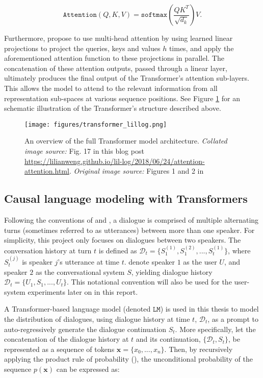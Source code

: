 \begin{equation}
    \texttt{Attention}(Q, K, V) = \texttt{softmax} \left( \frac{QK^T}{\sqrt{d_k}}\right) V.
\end{equation}

Furthermore, \cite{vaswani2017attention} propose to use multi-head attention by using learned linear projections to project the queries, keys and values $h$ times, and apply the aforementioned attention function to these projections in parallel. The concatenation of these attention outputs, passed through a linear layer, ultimately produces the final output of the Transformer's attention sub-layers. This allows the model to attend to the relevant information from all representation sub-spaces at various sequence positions. See Figure \ref{fig:transformer_architecture} for an schematic illustration of the Transformer's structure described above.


\begin{figure}[H]
    \centering
    \texttt{[image: figures/transformer\_lillog.png]}
    \caption{An overview of the full Transformer model architecture. \textit{Collated image source:} Fig. 17 in this blog post \url{https://lilianweng.github.io/lil-log/2018/06/24/attention-attention.html}. \textit{Original image source:} Figures 1 and 2 in \cite{vaswani2017attention}}
    \label{fig:transformer_architecture}
\end{figure}

\subsection{Causal language modeling with Transformers}

Following the conventions of \cite{dathathri2019plug} and \cite{madotto-etal-2020-plug}, a dialogue is comprised of multiple alternating turns (sometimes referred to as utterances) between more than one speaker. For simplicity, this project only focuses on dialogues between two speakers. The conversation history at turn $t$ is defined as $\mathcal{D}_t = \{S^{(1)}_1, S^{(2)}_1, ..., S^{(1)}_t\}$, where $S^{(j)}_t$ is speaker $j$'s utterance at time $t$. \cite{madotto-etal-2020-plug} denote speaker $1$ as the user $U$, and speaker $2$ as the conversational system $S$, yielding dialogue history $\mathcal{D}_t = \{U_1, S_1, ..., U_t\}$. This notational convention will also be used for the user-system experiments later on in this report.

A Transformer-based language model (denoted $\texttt{LM}$) is used in this thesis to model the distribution of dialogues, using dialogue history at time $t$, $\mathcal{D}_t$, as a prompt to auto-regressively generate the dialogue continuation $S_t$. More specifically, let the concatenation of the dialogue history at $t$ and its continuation, $\{\mathcal{D}_t, S_t\}$, be represented as a sequence of tokens $\textbf{x}= \{x_0, ..., x_n\}$. Then, by recursively applying the product rule of probability (\cite{bishop2006pattern}), the unconditional probability of the sequence $p(\textbf{x})$ can be expressed as:

